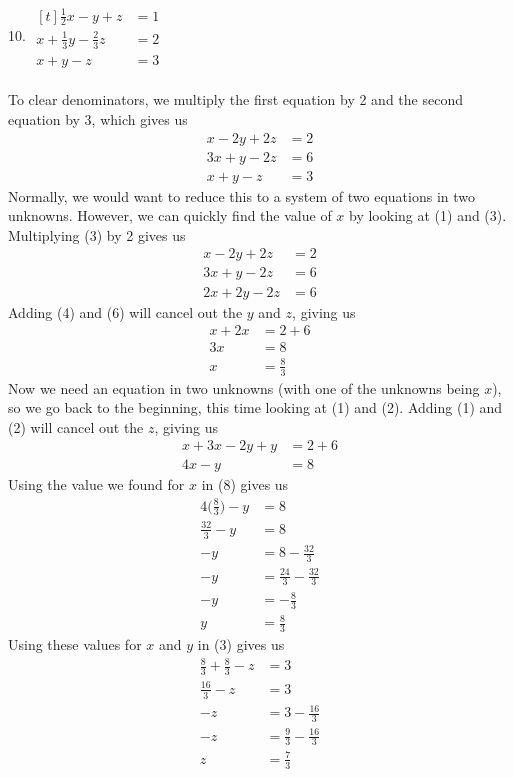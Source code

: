 \documentclass[12pt]{article}
\begin{document}
\setcounter{equation}{0}
10. $\begin{aligned}[t]
\frac{1}{2}x-y+z&=1 \\
x+\frac{1}{3}y-\frac{2}{3}z&=2 \\
x+y-z&=3
\end{aligned}$ \\
\\
To clear denominators, we multiply the first equation by 2 and the second equation by 3, which gives us
\begin{align}
x-2y+2z&=2 \\
3x+y-2z&=6 \\
x+y-z&=3
\end{align}
Normally, we would want to reduce this to a system of two equations in two unknowns. However, we can quickly find the value of $x$ by looking at (1) and (3). Multiplying (3) by 2 gives us
\begin{align}
x-2y+2z&=2 \\
3x+y-2z&=6 \\
2x+2y-2z&=6
\end{align}
Adding (4) and (6) will cancel out the $y$ and $z$, giving us
\begin{align*}
x+2x&=2+6 \\
3x&=8 \\
x&=\displaystyle \frac{8}{3}
\end{align*}
Now we need an equation in two unknowns (with one of the unknowns being $x$), so we go back to the beginning, this time looking at (1) and (2). Adding (1) and (2) will cancel out the $z$, giving us
\begin{align}
x+3x-2y+y&=2+6 \\
4x-y&=8
\end{align}
Using the value we found for $x$ in (8) gives us
\begin{align*}
4\bigg(\displaystyle \frac{8}{3}\bigg)-y&=8 \\
\displaystyle \frac{32}{3}-y&=8 \\
-y&=8-\displaystyle \frac{32}{3} \\
-y&=\displaystyle \frac{24}{3}-\displaystyle \frac{32}{3} \\
-y&=-\displaystyle \frac{8}{3} \\
y&=\displaystyle \frac{8}{3}
\end{align*}
Using these values for $x$ and $y$ in (3) gives us
\begin{align*}
\displaystyle \frac{8}{3}+\displaystyle \frac{8}{3}-z&=3 \\
\displaystyle \frac{16}{3}-z&=3 \\
-z&=3-\displaystyle \frac{16}{3} \\
-z&=\displaystyle \frac{9}{3}-\displaystyle \frac{16}{3} \\
z&=\displaystyle \frac{7}{3}
\end{align*}
\end{document}

